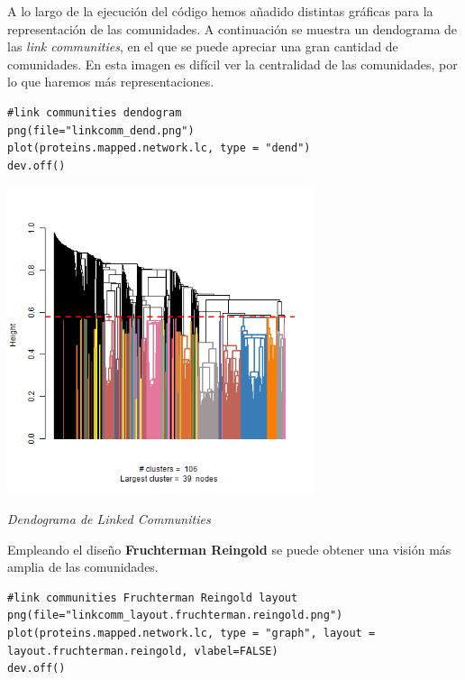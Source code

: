 A lo largo de la ejecución del código hemos añadido distintas gráficas para la representación de las comunidades. A continuación se muestra un dendograma de las 
\textit{link communities}, en el que se puede apreciar una gran cantidad de comunidades. En esta imagen es difícil ver la centralidad de las comunidades, 
por lo que haremos más representaciones.

\begin{lstlisting}
#link communities dendogram
png(file="linkcomm_dend.png")
plot(proteins.mapped.network.lc, type = "dend")
dev.off()
\end{lstlisting}

\begin{center}
\includegraphics[width=90mm,scale=1]{report/figures/linkcomm_dend.png}


\caption{\textit{Dendograma de Linked Communities}}

\end{center}


Empleando el diseño \textbf{ Fruchterman Reingold} se puede obtener una visión más amplia de las comunidades. 

\begin{lstlisting}
#link communities Fruchterman Reingold layout
png(file="linkcomm_layout.fruchterman.reingold.png")
plot(proteins.mapped.network.lc, type = "graph", layout =
layout.fruchterman.reingold, vlabel=FALSE)
dev.off()
\end{lstlisting}

